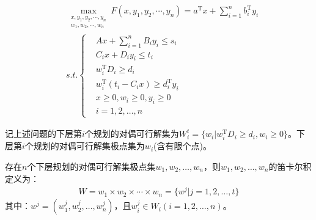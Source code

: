     \begin{align*}
        &\mathop{\max}\limits_{\substack{x,y_1,y_2,\cdots,y_n\\w_1,w_2,\cdots,w_n}} F(x,y_1,y_2,\cdots,y_n)=a^\mathrm{T} x+\mathop{\sum}\limits_{i=1}^nb_i^\mathrm{T} y_i\\
        & s.t.\left\{
        \begin{aligned}
        & Ax+\mathop{\sum}\limits_{i=1}^nB_iy_i\leqslant s_i\\
        & C_ix+D_iy_i\leqslant t_i\\
        & w_i^\mathrm{T} D_i\geqslant d_i\\
        & w_i^\mathrm{T} (t_i-C_ix)\geqslant d_i^\mathrm{T} y_i\\
        & x \geqslant 0,w_i \geqslant 0 ,y_i \geqslant 0\\
        & i=1,2,\ldots,n
        \end{aligned}
            \right.
    \end{align*}
    \par
    记上述问题的下层第$i$个规划的对偶可行解集为$W_i^t=\{w_i|w_i^\mathrm{T} D_i\geqslant d_i,w_i\geqslant 0\}$。下层第$i$个规划的对偶可行解集极点集为$w_i$(含有限个点)。
    \begin{definition}
    存在$n$个下层规划的对偶可行解集极点集$w_1,w_2,\ldots,w_n$，则$w_1,w_2,\ldots,w_n$的笛卡尔积定义为：
    \begin{align*}
        W=w_1\times w_2\times \cdots \times w_n=\{w^j|j=1,2,\ldots,t\}
    \end{align*}
    其中：$w^j=(w_1^j,w_2^j,\ldots,w_n^j)$，且$w_i^j\in  W_i(i=1,2,\ldots,n)$。
    \end{definition}

